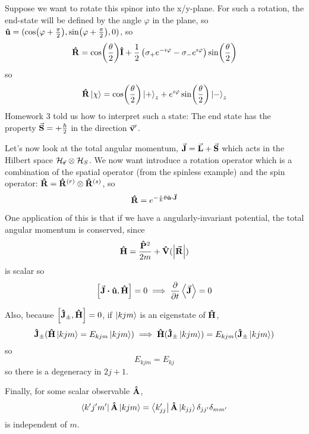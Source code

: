 \documentclass[a4paper,twoside,master.tex]{subfiles}
\begin{document}
Suppose we want to rotate this spinor into the x/y-plane. For such a rotation, the end-state will be defined by the angle $ \varphi $ in the plane, so $ \vu{u} = ( \cos(\varphi + \frac{\pi}{2}), \sin(\varphi + \frac{\pi}{2}), 0) $, so
\begin{equation}
    \vu{R} = \cos(\frac{\theta}{2}) \vu{I} + \frac{1}{2} \left( \sigma_+ e^{- \imath \varphi} - \sigma_- e^{\imath \varphi} \right) \sin(\frac{\theta}{2})
\end{equation}
so
\begin{equation}
    \vu{R}\ket{\chi} = \cos(\frac{\theta}{2})\ket{+}_z + e^{\imath \varphi} \sin(\frac{\theta}{2})\ket{-}_z
\end{equation}
Homework 3 told us how to interpret such a state: The end state has the property $ \va{S} = + \frac{\hbar}{2} $ in the direction $ \va{v}' $.

Let's now look at the total angular momentum, $ \va{J} = \va{L} + \va{S} $ which acts in the Hilbert space $ \mathcal{H}_{ \va{r}} \otimes \mathcal{H}_S $. We now want introduce a rotation operator which is a combination of the spatial operator (from the spinless example) and the spin operator: $ \vu{R} = \vu{R}^{(r)} \otimes \vu{R}^{(s)} $, so
\begin{equation}
    \vu{R} = e^{- \frac{\imath}{\hbar} \theta \vu{u} \vdot \va{J}}
\end{equation}

One application of this is that if we have a angularly-invariant potential, the total angular momentum is conserved, since
\begin{equation}
    \vu{H} = \frac{ \vu{P}^2}{2m} + \vu{V}(\abs{ \va{R}})
\end{equation}
is scalar so
\begin{equation}
    \comm{ \va{J} \vdot \vu{u}}{ \vu{H}} = 0 \implies \pdv{t} \ev{ \va{J}} = 0
\end{equation}

Also, because $ \comm{ \vu{J}_{\pm}}{ \vu{H}} = 0 $, if $\ket{kjm} $ is an eigenstate of $ \vu{H} $,
\begin{equation}
    \vu{J}_{\pm}( \vu{H}\ket{kjm} = E_{kjm}\ket{kjm}) \implies \vu{H}( \vu{J}_{\pm}\ket{kjm}) = E_{kjm} ( \vu{J}_{\pm}\ket{kjm})
\end{equation}
so
\begin{equation}
    E_{kjm} = E_{kj}
\end{equation}
so there is a degeneracy in $ 2j + 1 $.

Finally, for some scalar observable $ \vu{A} $,
\begin{equation}
    \bra{k'j'm'} \vu{A} \ket{kjm} =\bra{k'_{jj}} \vu{A}\ket{k_{jj}} \delta_{jj'} \delta_{mm'}
\end{equation}
is independent of $ m $.
\end{document}
